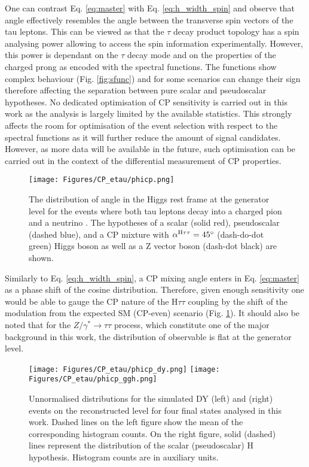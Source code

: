 One can contrast Eq. \ref{eq:master} with Eq. \ref{eq:h_width_spin} and observe that \phicp angle effectively resembles the angle between the transverse spin vectors of the tau leptons. This can be viewed as that the $\tau$ decay product topology has a spin analysing power allowing to access the spin information experimentally. However, this power is dependant on the $\tau$ decay mode and on the properties of the charged prong as encoded with the spectral functions. The functions show complex behaviour (Fig. \ref{fig:sfunc}) and for some scenarios can change their sign therefore affecting the separation between pure scalar and pseudoscalar hypotheses. No dedicated optimisation of CP sensitivity is carried out in this work as the analysis is largely limited by the available statistics. This strongly affects the room for optimisation of the event selection with respect to the spectral functions as it will further reduce the amount of signal candidates. However, as more data will be available in the future, such optimisation can be carried out in the context of the differential measurement of CP \htt properties.

\begin{figure}[t!]
    \centering
    \texttt{[image: Figures/CP\_etau/phicp.png]}
    \caption{The distribution of \phicp angle in the Higgs rest frame at the generator level for the \htt events where both tau leptons decay into a charged pion and a neutrino \cite{CMS:2021sdq}. The hypotheses of a scalar (solid red), pseudoscalar (dashed blue), and a CP mixture with $\alpha^{\text{H}\tau\tau}=45^\circ$ (dash-do-dot green) Higgs boson as well as a Z vector boson (dash-dot black) are shown.}
    \label{fig:phicp}
\end{figure}

Similarly to Eq. \ref{eq:h_width_spin}, a CP mixing angle \mixa enters in Eq. \ref{eq:master} as a phase shift of the cosine distribution. Therefore, given enough sensitivity one would be able to gauge the CP nature of the $\text{H}\tau\tau$ coupling by the shift of the modulation from the expected SM (CP-even) scenario (Fig. \ref{fig:phicp}). It should also be noted that for the $Z/\gamma^* \to \tau\tau$ process, which constitute one of the major background in this work, the distribution of \phicp observable is flat at the generator level. 

\begin{figure}[t!]
    \centering
    \texttt{[image: Figures/CP\_etau/phicp\_dy.png]}
    \texttt{[image: Figures/CP\_etau/phicp\_ggh.png]}
    \caption{Unnormalised \phicp distributions for the simulated DY (left) and \htt (right) events on the reconstructed level for four final states analysed in this work. Dashed lines on the left figure show the mean of the corresponding histogram counts. On the right figure, solid (dashed) lines represent the distribution of the scalar (pseudoscalar) H hypothesis. Histogram counts are in auxiliary units.}
    \label{fig:phicp_e}
\end{figure}

